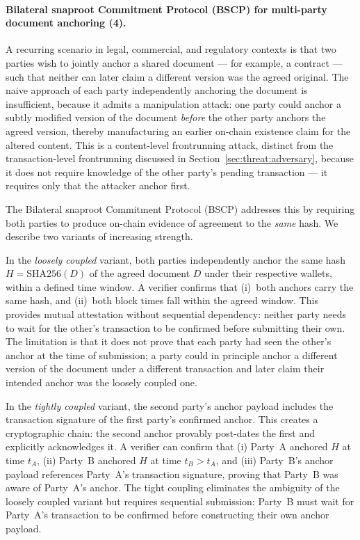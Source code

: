 \documentclass[11pt,a4paper]{article}
\begin{document}
\paragraph{Bilateral snaproot Commitment Protocol (BSCP) for multi-party document anchoring (4).}
\label{sec:limitations:bilateral}
A recurring scenario in legal, commercial, and regulatory contexts is
that two parties wish to jointly anchor a shared document --- for
example, a contract --- such that neither can later claim a different
version was the agreed original. The naive approach of each party
independently anchoring the document is insufficient, because it
admits a manipulation attack: one party could anchor a subtly modified
version of the document \emph{before} the other party anchors the
agreed version, thereby manufacturing an earlier on-chain existence
claim for the altered content. This is a content-level frontrunning
attack, distinct from the transaction-level frontrunning discussed in
Section~\ref{sec:threat:adversary}, because it does not require
knowledge of the other party's pending transaction --- it requires only
that the attacker anchor first.

The Bilateral snaproot Commitment Protocol (BSCP) addresses this by requiring both
parties to produce on-chain evidence of agreement to the \emph{same}
hash. We describe two variants of increasing strength.

In the \emph{loosely coupled} variant, both parties independently
anchor the same hash $H = \mathrm{SHA256}(D)$ of the agreed document
$D$ under their respective wallets, within a defined time window. A
verifier confirms that (i)~both anchors carry the same hash, and
(ii)~both block times fall within the agreed window. This provides mutual
attestation without sequential dependency: neither party needs to wait
for the other's transaction to be confirmed before submitting their
own. The limitation is that it does not prove that each party had seen
the other's anchor at the time of submission; a party could in
principle anchor a different version of the document under a different
transaction and later claim their intended anchor was the loosely
coupled one.

In the \emph{tightly coupled} variant, the second party's anchor
payload includes the transaction signature of the first party's
confirmed anchor. This creates a cryptographic chain: the second
anchor provably post-dates the first and explicitly acknowledges it.
A verifier can confirm that (i) Party~A anchored $H$ at time $t_A$,
(ii) Party~B anchored $H$ at time $t_B > t_A$, and (iii) Party~B's
anchor payload references Party~A's transaction signature, proving
that Party~B was aware of Party~A's anchor. The tight coupling
eliminates the ambiguity of the loosely coupled variant but requires
sequential submission: Party~B must wait for Party~A's transaction to
be confirmed before constructing their own anchor payload.
\end{document}
